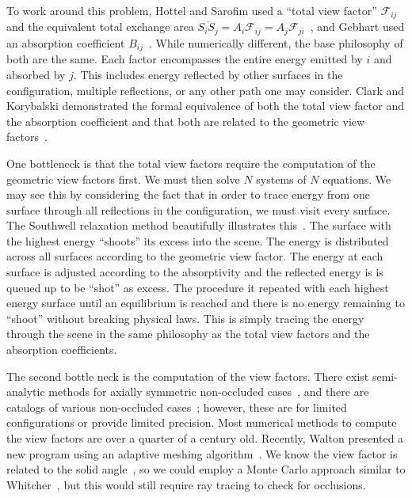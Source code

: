 To work around this problem, Hottel and Sarofim used a ``total view
factor'' \(\mathcal{F}_{ij}\) and the equivalent total exchange area
\(\overline{S_iS_j} = A_i\mathcal{F}_{ij} =
A_j\mathcal{F}_{ji}\)~\cite{hottel_radiative_1967}, and Gebhart used an
absorption coefficient \(B_{ij}\)~\cite{gebhart_surface_1961}.  While
numerically different, the base philosophy of both are the same.  Each
factor encompasses the entire energy emitted by \(i\) and absorbed by
\(j\).  This includes energy reflected by other surfaces in the
configuration, multiple reflections, or any other path one may consider.
Clark and Korybalski demonstrated the formal equivalence of both the
total view factor and the absorption coefficient and that both are
related to the geometric view factors~\cite{clark_algebraic_1974}.

One bottleneck is that the total view factors require the computation of
the geometric view factors first.  We must then solve \(N\) systems of
\(N\) equations.  We may see this by considering the fact that in order
to trace energy from one surface through all reflections in the
configuration, we must visit every surface.  The Southwell relaxation
method beautifully illustrates this~\cite{cohen_radiosity_1993}.  The
surface with the highest energy ``shoots'' its excess into the scene.
The energy is distributed across all surfaces according to the geometric
view factor.  The energy at each surface is adjusted according to the
absorptivity and the reflected energy is is queued up to be ``shot'' as
excess.  The procedure it repeated with each highest energy surface
until an equilibrium is reached and there is no energy remaining to
``shoot'' without breaking physical laws.  This is simply tracing the
energy through the scene in the same philosophy as the total view
factors and the absorption coefficients.

The second bottle neck is the computation of the view factors.  There
exist semi-analytic methods for axially symmetric non-occluded
cases~\cite{chung_simpler_1982, naraghi_radiation_1982,
chung_formulation_1984}, and there are catalogs of various non-occluded
cases~\cite{howell_catalog_2010}; however, these are for limited
configurations or provide limited precision.  Most numerical methods to
compute the view factors are over a quarter of a century old.  Recently,
Walton presented a new program using an adaptive meshing
algorithm~\cite{walton_calculation_2002}.  We know the view factor is
related to the solid angle~\cite{sparrow_new_1963}, so we could employ a
Monte Carlo approach similar to Whitcher~\cite{whitcher_monte_2012}, but
this would still require ray tracing to check for occlusions.

